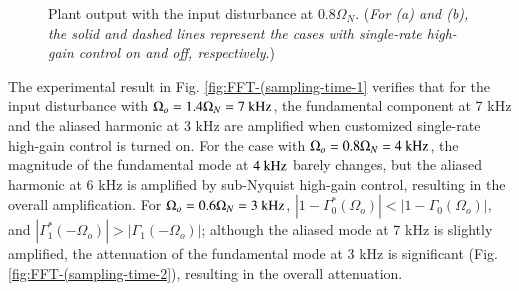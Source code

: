 \documentclass [11pt, proquest] {uwthesis}[2020/02/24]
\begin{document}
\begin{figure}[!ht]
\begin{centering}
{\begin{centering}
\par\end{centering}
}
\par\end{centering}
\caption{\label{fig:Plant-output-for-5}Plant output with the input disturbance
at $0.8\Omega_{N}$. (\emph{For (a) and (b), the solid and dashed lines
represent the cases with single-rate high-gain control on and off,
respectively}.)}
\end{figure}

The experimental result in Fig. \ref{fig:FFT-(sampling-time-1} verifies
that for the input disturbance with $\Omega_{o}=1.4\Omega_{N}=7\textnormal{ kHz}$,
the fundamental component at 7 kHz and the aliased harmonic at 3 kHz
are amplified when customized single-rate high-gain control is turned
on. For the case with $\Omega_{o}=0.8\Omega_{N}=4\textnormal{ kHz}$,
the magnitude of the fundamental mode at $4\textnormal{ kHz}$ barely
changes, but the aliased harmonic at 6 kHz is amplified by sub-Nyquist
high-gain control, resulting in the overall amplification. For $\Omega_{o}=0.6\Omega_{N}=3\textnormal{ kHz}$,
$\left|1-\Gamma_{0}^{*}(\Omega_{o})\right|<\left|1-\Gamma_{0}(\Omega_{o})\right|$,
and $\left|\Gamma_{1}^{*}(-\Omega_{o})\right|>\left|\Gamma_{1}(-\Omega_{o})\right|$;
although the aliased mode at 7 kHz is slightly amplified, the attenuation
of the fundamental mode at 3 kHz is significant (Fig. \ref{fig:FFT-(sampling-time-2}),
resulting in the overall attenuation.
\end{document}
